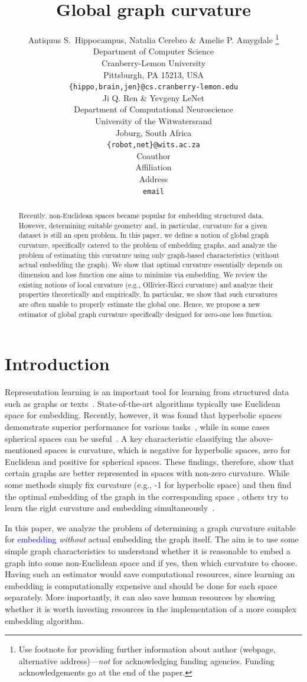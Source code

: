 \documentclass{article} %
\title{Global graph curvature}
\author{Antiquus S.~Hippocampus, Natalia Cerebro \& Amelie P. Amygdale \thanks{ Use footnote for providing further information
about author (webpage, alternative address)---\emph{not} for acknowledging
funding agencies.  Funding acknowledgements go at the end of the paper.} \\
Department of Computer Science\\
Cranberry-Lemon University\\
Pittsburgh, PA 15213, USA \\
\texttt{\{hippo,brain,jen\}@cs.cranberry-lemon.edu} \\
\And
Ji Q. Ren \& Yevgeny LeNet \\
Department of Computational Neuroscience \\
University of the Witwatersrand \\
Joburg, South Africa \\
\texttt{\{robot,net\}@wits.ac.za} \\
\AND
Coauthor \\
Affiliation \\
Address \\
\texttt{email}
}
\newcommand{\ph}[1]{\textcolor{blue}{#1}}
\begin{document}
\maketitle

\begin{abstract}
Recently, non-Euclidean spaces became popular for embedding structured data. However, determining suitable geometry and, in particular, curvature for a given dataset is still an open problem. 
In this paper, we define a notion of global graph curvature, specifically catered to the problem of embedding graphs, and analyze the problem of estimating this curvature using only graph-based characteristics (without actual embedding the graph).
We show that optimal curvature essentially depends on dimension and loss function one aims to minimize via embedding.
We review the existing notions of local curvature (e.g., Ollivier-Ricci curvature) and analyze their properties theoretically and empirically. 
In particular, we show that such curvatures are often unable to properly estimate the global one. 
Hence, we propose a new estimator of global graph curvature specifically designed for zero-one loss function.
\end{abstract}

\section{Introduction}

Representation learning is an important tool for learning from structured data such as graphs or texts~\citep{grover2016node2vec,perozzi2014deepwalk,mikolov2013distributed}.
State-of-the-art algorithms typically use Euclidean space for embedding. 
Recently, however, it was found that hyperbolic spaces demonstrate superior performance for various tasks~\citep{nickel2018learning,sala2018representation}, while in some cases spherical spaces can be useful~\citep{liu2017sphereface}. A key characteristic classifying the above-mentioned spaces is curvature, which is negative for hyperbolic spaces, zero for Euclidean and positive for spherical spaces. These findings, therefore, show that certain graphs are better represented in spaces with non-zero curvature. While some methods simply fix curvature (e.g., -1 for hyperbolic space) and then find the optimal embedding of the graph in the corresponding space \citep{nickel2018learning}, others try to learn the right curvature and embedding simultaneously~\citep{gu2019learning}.

In this paper, we analyze the problem of determining a graph curvature suitable for \ph{embedding} \textit{without} actual embedding the graph itself. The aim is to use some simple graph characteristics to understand whether it is reasonable to embed a graph into some non-Euclidean space and if yes, then which curvature to choose. 
Having such an estimator would save computational resources, since learning an embedding is computationally expensive and should be done for each space separately. 
More importantly, it can also save human resources by showing whether it is worth investing resources in the implementation of a more complex embedding algorithm.
\end{document}

